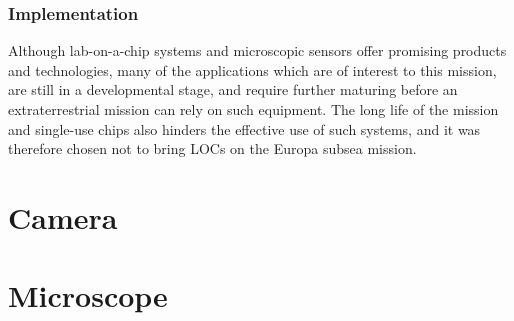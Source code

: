 \subsubsection{Implementation}
Although lab-on-a-chip systems and microscopic sensors offer promising products and technologies, many of the applications which are of interest to this mission, are still in a developmental stage, and require further maturing before an extraterrestrial mission can rely on such equipment. The long life of the mission and single-use chips also hinders the effective use of such systems, and it was therefore chosen not to bring LOCs on the Europa subsea mission.


\section{Camera}

\section{Microscope}
